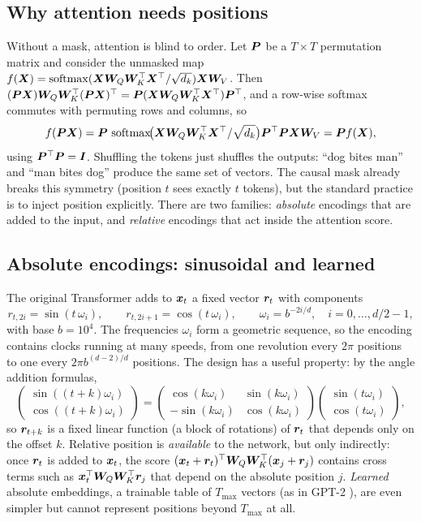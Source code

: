 \subsection{Why attention needs positions}\label{sec:c01-permutation}

Without a mask, attention is blind to order. Let $\bm{P}$ be a $T\times T$ permutation matrix and
consider the unmasked map $f(\bm{X}) = \operatorname{softmax}(\bm{X}\bm{W}_Q\bm{W}_K^{\top}\bm{X}^{\top}/\sqrt{d_k})\bm{X}\bm{W}_V$. Then
$(\bm{P}\bm{X})\bm{W}_Q\bm{W}_K^{\top}(\bm{P}\bm{X})^{\top} = \bm{P}(\bm{X}\bm{W}_Q\bm{W}_K^{\top}\bm{X}^{\top})\bm{P}^{\top}$, and a row-wise softmax
commutes with permuting rows and columns, so
\[
  f(\bm{P}\bm{X}) = \bm{P}\,\operatorname{softmax}\!\bigl(\bm{X}\bm{W}_Q\bm{W}_K^{\top}\bm{X}^{\top}/\sqrt{d_k}\bigr)\bm{P}^{\top}\bm{P}\bm{X}\bm{W}_V
  = \bm{P} f(\bm{X}),
\]
using $\bm{P}^{\top}\bm{P} = \bm{I}$. Shuffling the tokens just shuffles the outputs: ``dog bites man'' and
``man bites dog'' produce the same set of vectors. The causal mask already breaks this
symmetry (position $t$ sees exactly $t$ tokens), but the standard practice is to inject
position explicitly. There are two families: \emph{absolute} encodings that are added to
the input, and \emph{relative} encodings that act inside the attention score.

\subsection{Absolute encodings: sinusoidal and learned}\label{sec:c01-absolute}

The original Transformer \citep{vaswani2017attention} adds to $\bm{x}_t$ a fixed vector
$\bm{r}_t$ with components
\begin{equation}\label{eq:c01-sinusoidal}
  r_{t,2i} = \sin(t\,\omega_i),\qquad r_{t,2i+1} = \cos(t\,\omega_i),\qquad
  \omega_i = b^{-2i/d},\quad i = 0,\dots,d/2-1,
\end{equation}
with base $b = 10^4$. The frequencies $\omega_i$ form a geometric sequence, so the
encoding contains clocks running at many speeds, from one revolution every $2\pi$ positions
to one every $2\pi b^{(d-2)/d}$ positions. The design has a useful property: by the angle
addition formulas,
\[
\begin{pmatrix} \sin((t+k)\omega_i)\\ \cos((t+k)\omega_i)\end{pmatrix}
= \begin{pmatrix} \cos(k\omega_i) & \sin(k\omega_i)\\ -\sin(k\omega_i) & \cos(k\omega_i)\end{pmatrix}
  \begin{pmatrix} \sin(t\omega_i)\\ \cos(t\omega_i)\end{pmatrix},
\]
so $\bm{r}_{t+k}$ is a fixed linear function (a block of rotations) of $\bm{r}_t$ that depends only
on the offset $k$. Relative position is \emph{available} to the network, but only
indirectly: once $\bm{r}_t$ is added to $\bm{x}_t$, the score
$(\bm{x}_t + \bm{r}_t)^{\top}\bm{W}_Q\bm{W}_K^{\top}(\bm{x}_j + \bm{r}_j)$ contains cross terms such as
$\bm{x}_t^{\top}\bm{W}_Q\bm{W}_K^{\top}\bm{r}_j$ that depend on the absolute position $j$. \emph{Learned}
absolute embeddings, a trainable table of $T_{\max}$ vectors (as in GPT-2
\citep{c01-radford2019gpt2}), are even simpler but cannot represent positions beyond
$T_{\max}$ at all.

